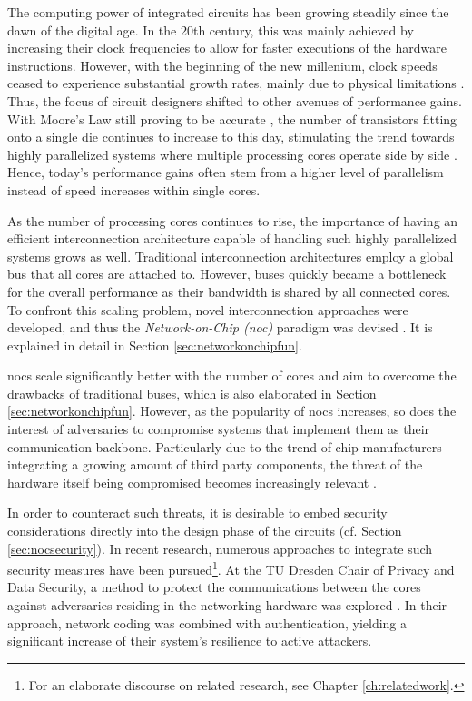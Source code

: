 The computing power of integrated circuits has been growing steadily since the dawn of the digital age. In the 20th century, this was mainly achieved
by increasing their clock frequencies to allow for faster executions of the hardware instructions. However, with the beginning of the new millenium,
clock speeds ceased to experience substantial growth rates, mainly due to physical limitations \cite{intelfrequency}. Thus, the focus of circuit
designers shifted to other avenues of performance gains. With Moore's Law still proving to be accurate \cite{mack11mooreslaw}, the number of
transistors fitting onto a single die continues to increase to this day, stimulating the trend towards highly parallelized systems where multiple
processing cores operate side by side \cite[6]{kumar08parallel}. Hence, today's performance gains often stem from a higher level of parallelism
instead of speed increases within single cores.

As the number of processing cores continues to rise, the importance of having an efficient interconnection architecture capable of handling such
highly parallelized systems grows as well. Traditional interconnection architectures employ a global bus that all cores are attached to. However,
buses quickly became a bottleneck for the overall performance \cite[6]{tatas16designingnocs} as their bandwidth is shared by all connected cores. To confront this
scaling problem, novel interconnection approaches were developed, and thus the \textit{Network-on-Chip (\gls{noc})} paradigm was devised
\cites{kumar02networkonchip}{benini02nocparadigm}. It is explained in detail in Section \ref{sec:networkonchipfun}.

\Glspl{noc} scale significantly better with the number of cores and aim to overcome the drawbacks of traditional buses, which is also elaborated in
Section \ref{sec:networkonchipfun}. However, as the popularity of \glspl{noc} increases, so does the interest of adversaries to compromise systems
that implement them as their communication backbone. Particularly due to the trend of chip manufacturers integrating a growing amount of third party components, the
threat of the hardware itself being compromised becomes increasingly relevant \cites{ancajas14fortnocs}{sethumadhavan15trustworthyhardware}.

In order to counteract such threats, it is desirable to embed security considerations directly into the design phase of the circuits (cf. Section
\ref{sec:nocsecurity}). In recent research, numerous approaches to integrate such security measures have been pursued\footnote{For an elaborate
discourse on related research, see Chapter \ref{ch:relatedwork}.}. At the TU Dresden Chair of Privacy and Data Security, a method to protect the
communications between the cores against adversaries residing in the networking hardware was explored
\cites{moriam15manycorenc}{moriam18activeattackers}. In their approach, network coding was combined with authentication, yielding a significant
increase of their system's resilience to active attackers.

